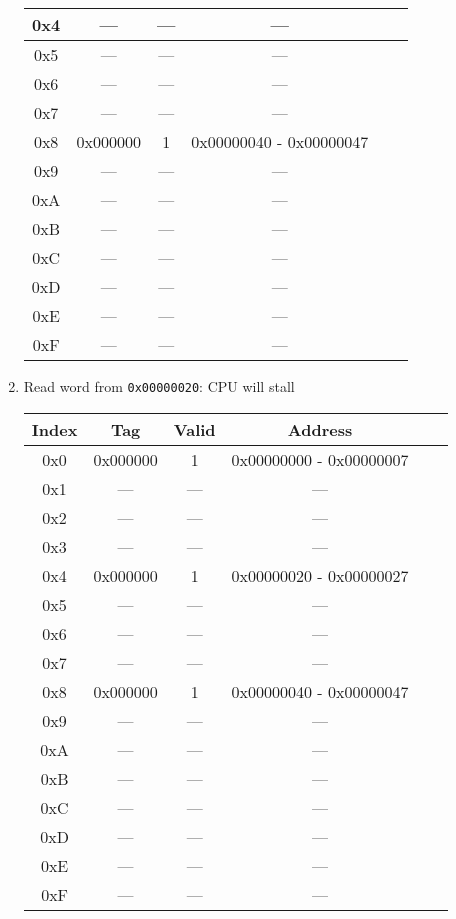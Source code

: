 \documentclass[12pt,letterpaper,titlepage]{article}
\begin{document}
\begin{raggedright}
\begin{enumerate}
\begin{center}
\begin{tabular}{|c|c|c|c|c|c|}
\\\hline 0x4   & ---      & ---   & ---        
\\\hline 0x5   & ---      & ---   & ---        
\\\hline 0x6   & ---      & ---   & ---        
\\\hline 0x7   & ---      & ---   & ---        
\\\hline 0x8   & 0x000000 & 1     & 0x00000040 - 0x00000047
\\\hline 0x9   & ---      & ---   & ---        
\\\hline 0xA   & ---      & ---   & ---        
\\\hline 0xB   & ---      & ---   & ---        
\\\hline 0xC   & ---      & ---   & ---        
\\\hline 0xD   & ---      & ---   & ---        
\\\hline 0xE   & ---      & ---   & ---        
\\\hline 0xF   & ---      & ---   & ---        
\\\hline
\end{tabular}
\end{center}
\pagebreak
    \item Read word from \texttt{0x00000020}: CPU will stall
\begin{center}
\def\arraystretch{1.35}
\begin{tabular}{|c|c|c|c|c|c|}
  \hline Index & Tag      & Valid & Address    
\\\hline 0x0   & 0x000000 & 1     & 0x00000000 - 0x00000007
\\\hline 0x1   & ---      & ---   & ---        
\\\hline 0x2   & ---      & ---   & ---        
\\\hline 0x3   & ---      & ---   & ---        
\\\hline 0x4   & 0x000000 & 1     & 0x00000020 - 0x00000027
\\\hline 0x5   & ---      & ---   & ---        
\\\hline 0x6   & ---      & ---   & ---        
\\\hline 0x7   & ---      & ---   & ---        
\\\hline 0x8   & 0x000000 & 1     & 0x00000040 - 0x00000047
\\\hline 0x9   & ---      & ---   & ---        
\\\hline 0xA   & ---      & ---   & ---        
\\\hline 0xB   & ---      & ---   & ---        
\\\hline 0xC   & ---      & ---   & ---        
\\\hline 0xD   & ---      & ---   & ---        
\\\hline 0xE   & ---      & ---   & ---        
\\\hline 0xF   & ---      & ---   & ---        
\\\hline
\end{tabular}
\end{center}
\pagebreak
\end{enumerate}

\end{raggedright}
\end{document}
